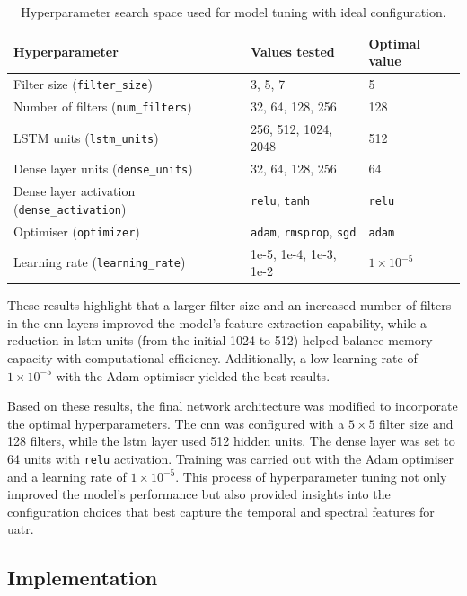 \begin{table}[htbp] 
\centering 
\caption{Hyperparameter search space used for model tuning with ideal configuration.} 
\label{tab:hyperparameter-search-space} 
    \begin{tabular}{lll} 
    \toprule 
    \textbf{Hyperparameter} & \textbf{Values tested} & \textbf{Optimal value} \\ 
    \midrule 
    Filter size (\texttt{filter\_size}) & 3, 5, 7 & 5 \\ 
    Number of filters (\texttt{num\_filters}) & 32, 64, 128, 256 & 128 \\ 
    LSTM units (\texttt{lstm\_units}) & 256, 512, 1024, 2048 & 512 \\ 
    Dense layer units (\texttt{dense\_units}) & 32, 64, 128, 256 & 64 \\ 
    Dense layer activation (\texttt{dense\_activation}) & \texttt{relu}, \texttt{tanh} & \texttt{relu} \\ 
    Optimiser (\texttt{optimizer}) & \texttt{adam}, \texttt{rmsprop}, \texttt{sgd} & \texttt{adam} \\ 
    Learning rate (\texttt{learning\_rate}) & 1e-5, 1e-4, 1e-3, 1e-2 & $1 \times 10^{-5}$ \\ 
    \bottomrule 
    \end{tabular} 
\end{table}

These results highlight that a larger filter size and an increased number of filters in the \acrshort{cnn} layers improved the model's feature extraction capability, while a reduction in \acrshort{lstm} units (from the initial 1024 to 512) helped balance memory capacity with computational efficiency. Additionally, a low learning rate of $1 \times 10^{-5}$ with the Adam optimiser yielded the best results.

Based on these results, the final network architecture was modified to incorporate the optimal hyperparameters. The \acrshort{cnn} was configured with a $5\times5$ filter size and 128 filters, while the \acrshort{lstm} layer used 512 hidden units. The dense layer was set to 64 units with \texttt{relu} activation. Training was carried out with the Adam optimiser and a learning rate of $1 \times 10^{-5}$. This process of hyperparameter tuning not only improved the model's performance but also provided insights into the configuration choices that best capture the temporal and spectral features for \acrlong{uatr}.

\subsection{Implementation}

